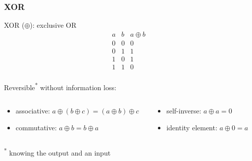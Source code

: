 \begin{frame}
  \frametitle{XOR}

  \pause
  XOR ($\oplus$): exclusive OR
  \pause
  \begin{displaymath}
    \begin{array}{|c|c|c|}
      a & b & a \oplus b\\
      \hline
      0 & 0 & 0\\
      0 & 1 & 1\\
      1 & 0 & 1\\
      1 & 1 & 0\\
    \end{array}
  \end{displaymath}

  \pause
  Reversible\textsuperscript{*} without information loss:
  \begin{columns}[T]
    \begin{column}{.5\textwidth}
      \begin{itemize}[<+(1)->]
        \item associative: $a \oplus (b \oplus c) = (a \oplus b) \oplus c$
        \item commutative: $a \oplus b = b \oplus a$
      \end{itemize}
    \end{column}
    \begin{column}{.5\textwidth}
      \begin{itemize}[<+(1)->]
        \item self-inverse: $a \oplus a = 0$
        \item identity element: $a \oplus 0 = a$
      \end{itemize}
    \end{column}
  \end{columns}

  \vspace*{1em}

  {\scriptsize \textsuperscript{*} knowing the output and an input}
\end{frame}

